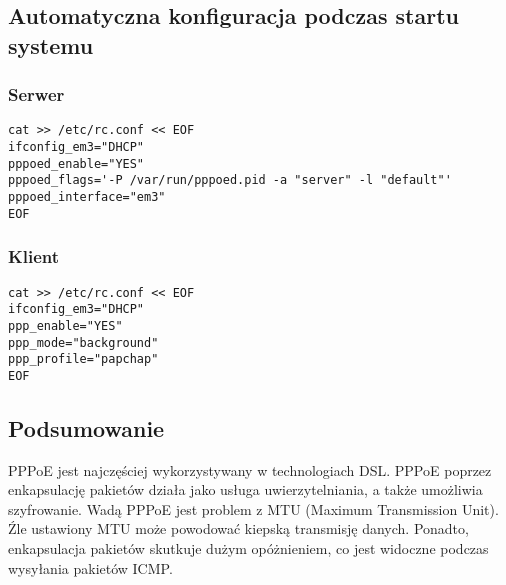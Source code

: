 \documentclass[a4paper,11pt]{article}
\begin{document}
\subsection*{Automatyczna konfiguracja podczas startu systemu}

\subsubsection*{Serwer}
\begin{verbatim}
cat >> /etc/rc.conf << EOF
ifconfig_em3="DHCP"
pppoed_enable="YES"
pppoed_flags='-P /var/run/pppoed.pid -a "server" -l "default"'
pppoed_interface="em3"
EOF
\end{verbatim}

\subsubsection*{Klient}

\begin{verbatim}
cat >> /etc/rc.conf << EOF
ifconfig_em3="DHCP"
ppp_enable="YES"
ppp_mode="background"
ppp_profile="papchap"
EOF
\end{verbatim}
\subsection*{Podsumowanie}
PPPoE jest najczęściej wykorzystywany w technologiach DSL. PPPoE poprzez enkapsulację pakietów działa jako usługa uwierzytelniania, a także umożliwia szyfrowanie. Wadą PPPoE jest problem z MTU (Maximum Transmission Unit). Źle ustawiony MTU może powodować kiepską transmisję danych. Ponadto, enkapsulacja pakietów skutkuje dużym opóżnieniem, co jest widoczne podczas wysyłania pakietów ICMP.
\end{document}
